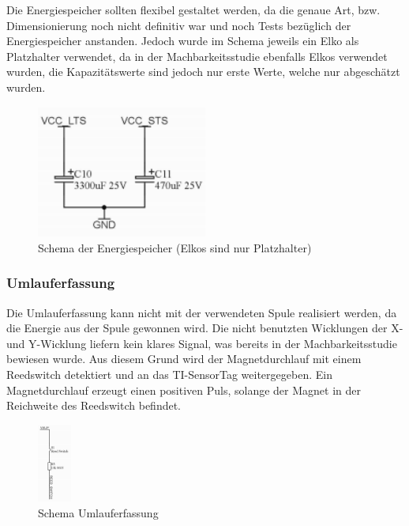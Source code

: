 Die Energiespeicher sollten flexibel gestaltet werden, da die genaue Art, bzw. Dimensionierung noch nicht definitiv war und noch Tests bezüglich der Energiespeicher anstanden. Jedoch wurde im Schema jeweils ein Elko als Platzhalter verwendet, da in der Machbarkeitsstudie ebenfalls Elkos verwendet wurden, die Kapazitätswerte sind jedoch nur erste Werte, welche nur abgeschätzt wurden.

\begin{figure}[ht]
    \includegraphics[width=0.5\textwidth]{3Vorgehen/imag/Schema_Energiespeicher.png}
    \caption{Schema der Energiespeicher (Elkos sind nur Platzhalter)}
    \label{schema_energiespeicher} 
\end{figure}

\subsubsection{Umlauferfassung}

Die Umlauferfassung kann nicht mit der verwendeten Spule realisiert werden, da die Energie aus der Spule gewonnen wird. Die nicht benutzten Wicklungen der X- und Y-Wicklung liefern kein klares Signal, was bereits in der Machbarkeitsstudie bewiesen wurde. Aus diesem Grund wird der Magnetdurchlauf mit einem Reedswitch detektiert und an das TI-SensorTag weitergegeben. Ein Magnetdurchlauf erzeugt einen positiven Puls, solange der Magnet in der Reichweite des Reedswitch befindet.

\begin{figure}[ht]
    \includegraphics[width=0.1\textwidth]{3Vorgehen/imag/Schema_Umlaufdetektion.png}
    \caption{Schema Umlauferfassung}\label{schema_umlaufdetektion} 
\end{figure}

